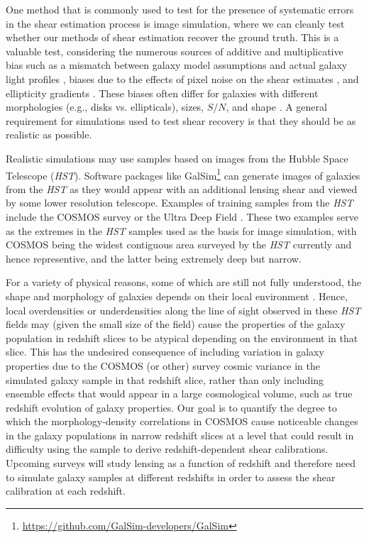 \documentclass[twocolumn,useAMS,usenatbib]{mn2e}
\begin{document}
One method that is commonly used to test for the presence of
systematic errors in the shear estimation process is image simulation,
where we can cleanly test whether our methods of shear estimation
recover the ground truth. This is a valuable test, considering the
numerous sources of additive and multiplicative bias such as a
mismatch between galaxy model assumptions and actual galaxy light
profiles \citep[e.g.,][]{2010MNRAS.404..458V, 2010A&A...510A..75M}, biases due to the effects of pixel noise on the
shear estimates
\citep{2012MNRAS.427.2711K,2012MNRAS.424.2757M,2012MNRAS.425.1951R},
and ellipticity gradients \citep{2010MNRAS.406.2793B}.  These biases
often differ for galaxies with different morphologies (e.g., disks
vs. ellipticals), sizes, $S/N$, and shape \citep{2010MNRAS.405.2044B,2012MNRAS.423.3163K}. 
A general requirement for simulations used to test shear recovery is
that they should be as realistic as possible.
 
 Realistic simulations may use samples based on images from the Hubble
 Space Telescope ({\em HST}).
Software packages like
{\sc GalSim}\footnote{\url{https://github.com/GalSim-developers/GalSim}}
\citep{2014arXiv1407.7676R} can generate images of galaxies from the
{\em HST} as they would appear with an additional lensing shear and
viewed by some lower resolution telescope.  Examples of training samples from the {\em HST} include 
the COSMOS survey \citep[used by the GREAT3 challenge,][]{great3} or the
 Ultra Deep Field \citep[UDF, used by][]{2013ApJ...765...74J}.  These
 two examples serve as the extremes in the {\em HST} samples used as
 the basis for image simulation, with COSMOS being 
the widest contiguous area surveyed by the {\em HST} currently and hence representive, and the 
latter being extremely deep but narrow.

For a variety of physical reasons, some of which are still not fully
understood, the shape and morphology of
galaxies depends on their local environment
\citep[e.g.,][]{2014arXiv1402.1172C,2014MNRAS.444.2200D}. 
Hence, local overdensities or underdensities along the line of sight
observed in these {\em HST} fields may (given the small size of the field)
cause the properties of the galaxy population in redshift slices to be
atypical depending on the environment in that slice.  This has
the undesired consequence of including variation in galaxy properties
due to the COSMOS (or other) survey cosmic variance in the simulated galaxy sample in that redshift slice, rather than
only including ensemble effects that would appear in a large cosmological volume, such as true redshift evolution of
galaxy properties.  Our goal is to quantify the degree to which the
morphology-density correlations in COSMOS cause noticeable changes in
the galaxy populations in narrow redshift slices at a level that could
result in difficulty using the sample to derive redshift-dependent
shear calibrations.   Upcoming surveys will study lensing as a function of
redshift and therefore need to simulate galaxy samples at different
redshifts in order to assess the shear calibration at each redshift.
\end{document}
